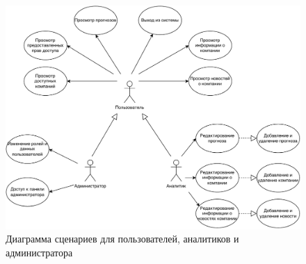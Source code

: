 \newpage

\begin{figure}[h!]
	\begin{center}
		\includegraphics[scale=0.76]{inc/img/use-case.pdf}
	\end{center}
	\captionsetup{justification=centering}
	\caption{Диаграмма сценариев для пользователей, аналитиков и администратора}
	\label{img:use-case}
\end{figure}


\newpage
